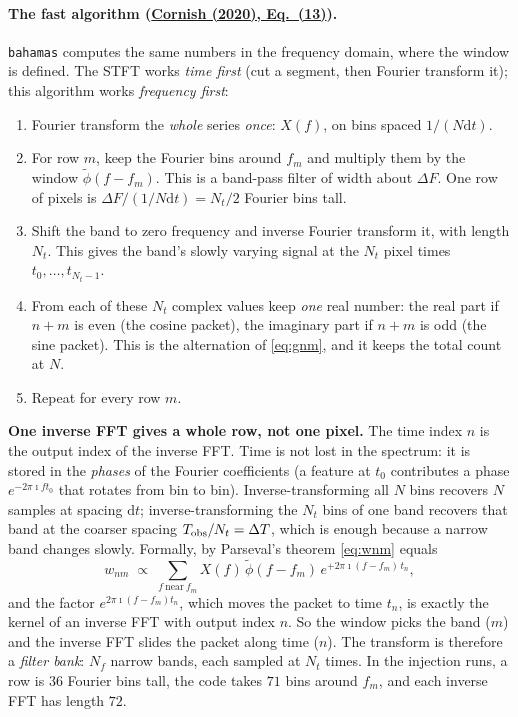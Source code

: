 \documentclass[11pt,a4paper]{article}
\newcommand{\urlCornish}{https://arxiv.org/abs/2009.00043}
\newcommand{\CornishEq}[1]{\href{\urlCornish}{Cornish (2020), Eq.~(#1)}}
\newcommand{\dd}{\mathrm{d}}
\begin{document}
\paragraph{The fast algorithm (\CornishEq{13}).} \texttt{bahamas} computes the same
numbers in the frequency domain, where the window is defined. The STFT works
\emph{time first} (cut a segment, then Fourier transform it); this algorithm works
\emph{frequency first}:
\begin{enumerate}
  \item Fourier transform the \emph{whole} series \emph{once}: $X(f)$, on bins spaced
        $1/(N\dd t)$.
  \item For row $m$, keep the Fourier bins around $f_m$ and multiply them by the
        window $\tilde\phi(f-f_m)$. This is a band-pass filter of width about
        $\Delta F$. One row of pixels is $\Delta F/(1/N\dd t) = N_t/2$ Fourier bins
        tall.
  \item Shift the band to zero frequency and inverse Fourier transform it, with length
        $N_t$. This gives the band's slowly varying signal at the $N_t$ pixel times
        $t_0,\dots,t_{N_t-1}$.
  \item From each of these $N_t$ complex values keep \emph{one} real number: the real
        part if $n+m$ is even (the cosine packet), the imaginary part if $n+m$ is odd
        (the sine packet). This is the alternation of \cref{eq:gnm}, and it keeps the
        total count at $N$.
  \item Repeat for every row $m$.
\end{enumerate}
\textbf{One inverse FFT gives a whole row, not one pixel.} The time index $n$ is the
output index of the inverse FFT. Time is not lost in the spectrum: it is stored in the
\emph{phases} of the Fourier coefficients (a feature at $t_0$ contributes a phase
$e^{-2\pi\imath f t_0}$ that rotates from bin to bin). Inverse-transforming all $N$
bins recovers $N$ samples at spacing $\dd t$; inverse-transforming the $N_t$ bins of
one band recovers that band at the coarser spacing $T_{\rm obs}/N_t=\Delta T$, which is
enough because a narrow band changes slowly. Formally, by Parseval's theorem
\cref{eq:wnm} equals
\[
  w_{nm} \;\propto\; \sum_{f\ \text{near}\ f_m} X(f)\,\tilde\phi(f-f_m)\,
  e^{+2\pi\imath (f-f_m)\,t_n},
\]
and the factor $e^{2\pi\imath(f-f_m)t_n}$, which moves the packet to time $t_n$, is
exactly the kernel of an inverse FFT with output index $n$. So the window picks the
band ($m$) and the inverse FFT slides the packet along time ($n$). The transform is
therefore a \emph{filter bank}: $N_f$ narrow bands, each sampled at $N_t$ times. In the
injection runs, a row is $36$ Fourier bins tall, the code takes $71$ bins around
$f_m$, and each inverse FFT has length $72$.
\end{document}
